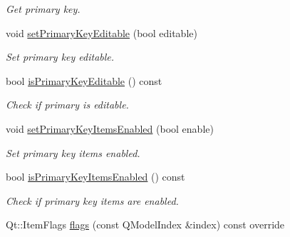 \begin{DoxyCompactItemize}
\begin{DoxyCompactList}\small\item\em Get primary key. \end{DoxyCompactList}\item 
void \hyperlink{class_mdt_1_1_item_model_1_1_primary_key_proxy_model_ad8649160eeda780a0e995f144c95daef}{set\+Primary\+Key\+Editable} (bool editable)
\begin{DoxyCompactList}\small\item\em Set primary key editable. \end{DoxyCompactList}\item 
bool \hyperlink{class_mdt_1_1_item_model_1_1_primary_key_proxy_model_a87f09a512cfc2ae8eb889e74590d1104}{is\+Primary\+Key\+Editable} () const \hypertarget{class_mdt_1_1_item_model_1_1_primary_key_proxy_model_a87f09a512cfc2ae8eb889e74590d1104}{}\label{class_mdt_1_1_item_model_1_1_primary_key_proxy_model_a87f09a512cfc2ae8eb889e74590d1104}

\begin{DoxyCompactList}\small\item\em Check if primary is editable. \end{DoxyCompactList}\item 
void \hyperlink{class_mdt_1_1_item_model_1_1_primary_key_proxy_model_acf490d2b50b857de6b3c6e116d499f0c}{set\+Primary\+Key\+Items\+Enabled} (bool enable)
\begin{DoxyCompactList}\small\item\em Set primary key items enabled. \end{DoxyCompactList}\item 
bool \hyperlink{class_mdt_1_1_item_model_1_1_primary_key_proxy_model_a3d9d36843684052687ea0af46e90c025}{is\+Primary\+Key\+Items\+Enabled} () const \hypertarget{class_mdt_1_1_item_model_1_1_primary_key_proxy_model_a3d9d36843684052687ea0af46e90c025}{}\label{class_mdt_1_1_item_model_1_1_primary_key_proxy_model_a3d9d36843684052687ea0af46e90c025}

\begin{DoxyCompactList}\small\item\em Check if primary key items are enabled. \end{DoxyCompactList}\item 
Qt\+::\+Item\+Flags \hyperlink{class_mdt_1_1_item_model_1_1_primary_key_proxy_model_a47e7e15a0ebe811458f75c03bf123bea}{flags} (const Q\+Model\+Index \&index) const override\hypertarget{class_mdt_1_1_item_model_1_1_primary_key_proxy_model_a47e7e15a0ebe811458f75c03bf123bea}{}\label{class_mdt_1_1_item_model_1_1_primary_key_proxy_model_a47e7e15a0ebe811458f75c03bf123bea}


\end{DoxyCompactItemize}
